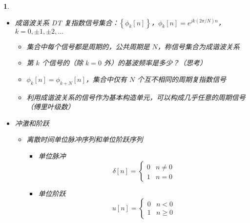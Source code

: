 \documentclass[UTF8]{report}
\theoremstyle{MyLineTheoremStyle} %
\theoremstyle{MyBlockTheoremStyle} %
\theoremstyle{MySubsubsectionStyle} %
\newtheorem{definition}{}
\begin{document}
\begin{definition}
\begin{itemize}
\begin{itemize}
            例：$x[n] = \cos\left(\frac{8\pi n}{31}\right)$，$\omega_0 = \frac{8\pi}{31}$，$m = 4$，$N = 31$；基波频率为：$\frac{2\pi}{31}$，样本每隔 31 个点才重复
        \end{itemize}

        \item 成谐波关系 DT 复指数信号集合：$\left\{\phi_k[n]\right\}$，$\phi_k[n] = e^{jk(2\pi/N)n}$，$k = 0, \pm1, \pm2, \ldots$
        \begin{itemize}
            \item 集合中每个信号都是周期的，公共周期是 $N$，称信号集合为成谐波关系
            \item 第 $k$ 个信号的（除 $k = 0$ 外）的基波频率是多少？（思考）
            \item $\phi_k[n] = \phi_{k+N}[n]$，集合中仅有 $N$ 个互不相同的周期复指数信号
            \item 利用成谐波关系的信号作为基本构造单元，可以构成几乎任意的周期信号（傅里叶级数）
        \end{itemize}

        \item 冲激和阶跃
        \begin{itemize}
            \item 离散时间单位脉冲序列和单位阶跃序列
            \begin{itemize}
                \item 单位脉冲
                \[
                \delta[n] = \begin{cases} 
                0 & n \neq 0 \\
                1 & n = 0 
                \end{cases}
                \]
                \item 单位阶跃
                \[
                u[n] = \begin{cases} 
                0 & n < 0 \\
                1 & n \geq 0 
                \end{cases}
                \]
            \end{itemize}
        \end{itemize}
    \end{itemize}
\end{definition}
\end{document}
